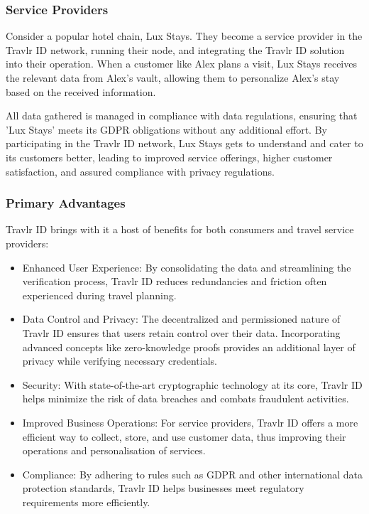 \documentclass{article}
\begin{document}
\subsubsection{Service Providers}

Consider a popular hotel chain, Lux Stays. They become a service provider in the Travlr ID network, running their node, and integrating the Travlr ID solution into their operation. When a customer like Alex plans a visit, Lux Stays receives the relevant data from Alex's vault, allowing them to personalize Alex's stay based on the received information.

All data gathered is managed in compliance with data regulations, ensuring that 'Lux Stays' meets its GDPR obligations without any additional effort. By participating in the Travlr ID network, Lux Stays gets to understand and cater to its customers better, leading to improved service offerings, higher customer satisfaction, and assured compliance with privacy regulations.

\subsubsection{Primary Advantages}

Travlr ID brings with it a host of benefits for both consumers and travel service providers:

\begin{itemize}
    \item Enhanced User Experience: By consolidating the data and streamlining the verification process, Travlr ID reduces redundancies and friction often experienced during travel planning. 
    \item Data Control and Privacy: The decentralized and permissioned nature of Travlr ID ensures that users retain control over their data. Incorporating advanced concepts like zero-knowledge proofs provides an additional layer of privacy while verifying necessary credentials.
    \item Security: With state-of-the-art cryptographic technology at its core, Travlr ID helps minimize the risk of data breaches and combats fraudulent activities.
    \item Improved Business Operations: For service providers, Travlr ID offers a more efficient way to collect, store, and use customer data, thus improving their operations and personalisation of services.
    \item Compliance: By adhering to rules such as GDPR and other international data protection standards, Travlr ID helps businesses meet regulatory requirements more efficiently.
\end{itemize}
\end{document}
